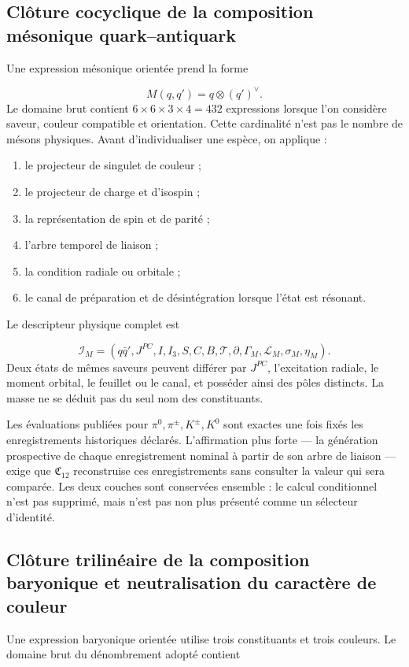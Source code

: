\subsection{Clôture cocyclique de la composition mésonique quark–antiquark}
Une expression mésonique orientée prend la forme

\[
M(q,q')=q\otimes(q')^\vee.
\]
Le domaine brut contient \(6\times6\times3\times4=432\) expressions lorsque l'on considère saveur, couleur compatible et orientation. Cette cardinalité n'est pas le nombre de mésons physiques. Avant d'individualiser une espèce, on applique :

\begin{enumerate}
\item le projecteur de singulet de couleur ;
\item le projecteur de charge et d'isospin ;
\item la représentation de spin et de parité ;
\item l'arbre temporel de liaison ;
\item la condition radiale ou orbitale ;
\item le canal de préparation et de désintégration lorsque l'état est résonant.
\end{enumerate}
Le descripteur physique complet est

\[
\mathcal I_M=
(q\bar q',J^{PC},I,I_3,S,C,B,\mathcal T,\partial,
\Gamma_M,\mathcal L_M,\sigma_M,\eta_M).
\]
Deux états de mêmes saveurs peuvent différer par \(J^{PC}\), l'excitation radiale, le moment orbital, le feuillet ou le canal, et posséder ainsi des pôles distincts. La masse ne se déduit pas du seul nom des constituants.

Les évaluations publiées pour \(\pi^0,\pi^\pm,K^\pm,K^0\) sont exactes une fois fixés les enregistrements historiques déclarés. L'affirmation plus forte --- la génération prospective de chaque enregistrement nominal à partir de son arbre de liaison --- exige que \(\mathfrak C_{12}\) reconstruise ces enregistrements sans consulter la valeur qui sera comparée. Les deux couches sont conservées ensemble : le calcul conditionnel n'est pas supprimé, mais n'est pas non plus présenté comme un sélecteur d'identité.

\subsection{Clôture trilinéaire de la composition baryonique et neutralisation du caractère de couleur}
Une expression baryonique orientée utilise trois constituants et trois couleurs. Le domaine brut du dénombrement adopté contient


